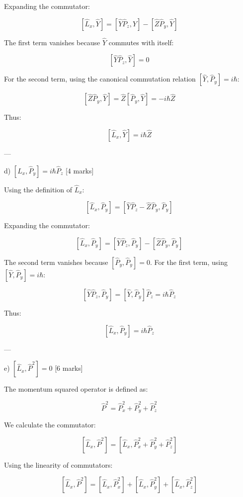 Expanding the commutator:

\[
\left[\hat{L}_x, \hat{Y}\right] = \left[\hat{Y}\hat{P}_z, \hat{Y}\right] - \left[\hat{Z}\hat{P}_y, \hat{Y}\right]
\]

The first term vanishes because \(\hat{Y}\) commutes with itself:

\[
\left[\hat{Y}\hat{P}_z, \hat{Y}\right] = 0
\]

For the second term, using the canonical commutation relation \([\hat{Y}, \hat{P}_y] = i\hbar\):

\[
\left[\hat{Z}\hat{P}_y, \hat{Y}\right] = \hat{Z} \left[\hat{P}_y, \hat{Y}\right] = -i\hbar \hat{Z}
\]

Thus:

\[
\left[\hat{L}_x, \hat{Y}\right] = i\hbar \hat{Z}
\]

---

d) \(\left[\hat{L}_x, \hat{P}_y\right] = i\hbar \hat{P}_z\) [4 marks]  

Using the definition of \(\hat{L}_x\):

\[
\left[\hat{L}_x, \hat{P}_y\right] = \left[\hat{Y}\hat{P}_z - \hat{Z}\hat{P}_y, \hat{P}_y\right]
\]

Expanding the commutator:

\[
\left[\hat{L}_x, \hat{P}_y\right] = \left[\hat{Y}\hat{P}_z, \hat{P}_y\right] - \left[\hat{Z}\hat{P}_y, \hat{P}_y\right]
\]

The second term vanishes because \([\hat{P}_y, \hat{P}_y] = 0\). For the first term, using \([\hat{Y}, \hat{P}_y] = i\hbar\):

\[
\left[\hat{Y}\hat{P}_z, \hat{P}_y\right] = \left[\hat{Y}, \hat{P}_y\right]\hat{P}_z = i\hbar \hat{P}_z
\]

Thus:

\[
\left[\hat{L}_x, \hat{P}_y\right] = i\hbar \hat{P}_z
\]

---

e) \(\left[\hat{L}_x, \hat{P}^2\right] = 0\) [6 marks]  

The momentum squared operator is defined as:

\[
\hat{P}^2 = \hat{P}_x^2 + \hat{P}_y^2 + \hat{P}_z^2
\]

We calculate the commutator:

\[
\left[\hat{L}_x, \hat{P}^2\right] = \left[\hat{L}_x, \hat{P}_x^2 + \hat{P}_y^2 + \hat{P}_z^2\right]
\]

Using the linearity of commutators:

\[
\left[\hat{L}_x, \hat{P}^2\right] = \left[\hat{L}_x, \hat{P}_x^2\right] + \left[\hat{L}_x, \hat{P}_y^2\right] + \left[\hat{L}_x, \hat{P}_z^2\right]
\]

